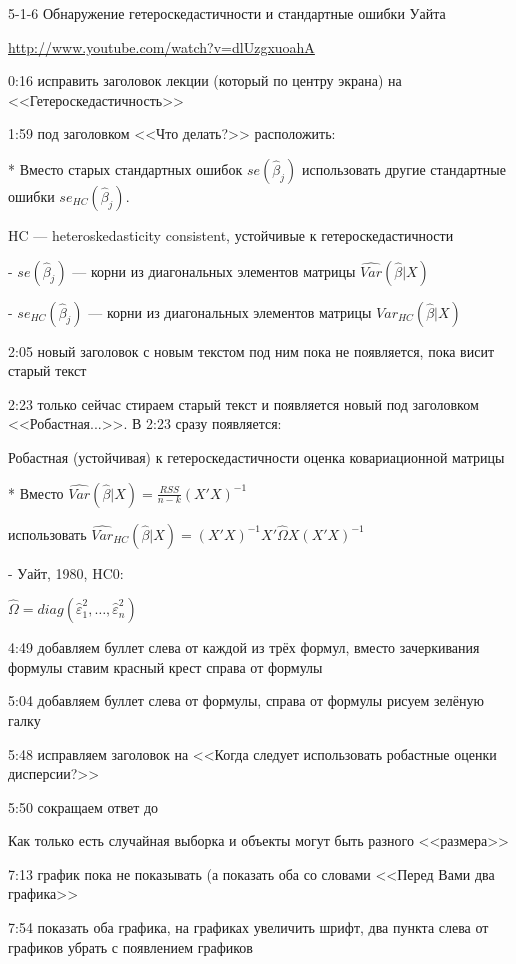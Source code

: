 \documentclass[12pt,a4paper]{article}
\renewcommand{\b}{\beta}
\newcommand{\hb}{\hat{\b}}
\begin{document}
5-1-6 Обнаружение гетероскедастичности и стандартные ошибки Уайта

\url{http://www.youtube.com/watch?v=dlUzgxuoahA}

0:16 исправить заголовок лекции (который по центру экрана) на <<Гетероскедастичность>>

1:59 под заголовком <<Что делать?>> расположить:

* Вместо старых стандартных ошибок $se(\hb_j)$ использовать другие стандартные ошибки $se_{HC}(\hb_j)$. 

HC --- heteroskedasticity consistent, устойчивые к гетероскедастичности

- $se(\hb_j)$ --- корни из диагональных элементов матрицы $\widehat{Var}(\hb|X)$

- $se_{HC}(\hb_j)$ --- корни из диагональных элементов матрицы $\widehat{Var}_{HC}(\hb|X)$

2:05 новый заголовок с новым текстом под ним пока не появляется, пока висит старый текст

2:23 только сейчас стираем старый текст и появляется новый  под заголовком <<Робастная...>>. В 2:23 сразу появляется:

Робастная (устойчивая) к гетероскедастичности оценка ковариационной матрицы

* Вместо $\widehat{Var}(\hat{\beta}|X)=\frac{RSS}{n-k}(X'X)^{-1}$ 

использовать $\widehat{Var}_{HC}(\hat{\beta}|X)=(X'X)^{-1}X'\hat{\Omega}X(X'X)^{-1}$

- Уайт, 1980, HC0: 

$\hat{\Omega}=diag( \hat{\varepsilon}_1^2, \ldots, \hat{\varepsilon}_n^2 )$

4:49 добавляем буллет слева от каждой из трёх формул, вместо зачеркивания формулы ставим красный крест справа от формулы

5:04 добавляем буллет слева от формулы, справа от формулы рисуем зелёную галку

5:48 исправляем заголовок на <<Когда следует использовать робастные оценки дисперсии?>>

5:50 сокращаем ответ до 

Как только есть случайная выборка и объекты могут быть разного <<размера>>

7:13 график пока не показывать (а показать оба со словами <<Перед Вами два графика>>

7:54 показать оба графика, на графиках увеличить шрифт, два пункта слева от графиков убрать с появлением графиков
\end{document}
